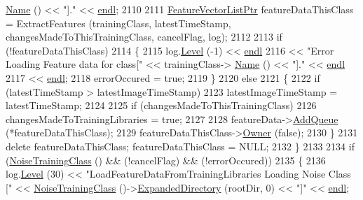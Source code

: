 \begin{DoxyCode}
      \hyperlink{class_k_k_m_l_l_1_1_training_class_ae10b765db09d3aadabdffa35960c906a}{Name} () << \textcolor{stringliteral}{"]."} << \hyperlink{namespace_k_k_b_ad1f50f65af6adc8fa9e6f62d007818a8}{endl};
2110 
2111     \hyperlink{class_k_k_m_l_l_1_1_feature_vector_list}{FeatureVectorListPtr}  featureDataThisClass = ExtractFeatures (trainingClass, 
      latestTimeStamp, changesMadeToThisTrainingClass, cancelFlag, log);
2112 
2113     \textcolor{keywordflow}{if}  (!featureDataThisClass)
2114     \{
2115       log.\hyperlink{class_k_k_b_1_1_run_log_a32cf761d7f2e747465fd80533fdbb659}{Level} (-1) << \hyperlink{namespace_k_k_b_ad1f50f65af6adc8fa9e6f62d007818a8}{endl}
2116                      << \textcolor{stringliteral}{"Error Loading Feature data for class["} << trainingClass->
      \hyperlink{class_k_k_m_l_l_1_1_training_class_ae10b765db09d3aadabdffa35960c906a}{Name} () << \textcolor{stringliteral}{"]."} << \hyperlink{namespace_k_k_b_ad1f50f65af6adc8fa9e6f62d007818a8}{endl}
2117                      << \hyperlink{namespace_k_k_b_ad1f50f65af6adc8fa9e6f62d007818a8}{endl};
2118       errorOccured = \textcolor{keyword}{true};
2119     \}
2120     \textcolor{keywordflow}{else}
2121     \{
2122       \textcolor{keywordflow}{if}  (latestTimeStamp > latestImageTimeStamp)
2123         latestImageTimeStamp = latestTimeStamp;
2124 
2125       \textcolor{keywordflow}{if}  (changesMadeToThisTrainingClass)
2126         changesMadeToTrainingLibraries = \textcolor{keyword}{true};
2127 
2128       featureData->\hyperlink{class_k_k_m_l_l_1_1_feature_vector_list_a90809e07f7e33e591da0d266c1907ca9}{AddQueue} (*featureDataThisClass);
2129       featureDataThisClass->\hyperlink{class_k_k_b_1_1_k_k_queue_a4990d037ff09dd504cc7df53819bf61a}{Owner} (\textcolor{keyword}{false});
2130     \}
2131     \textcolor{keyword}{delete}  featureDataThisClass;  featureDataThisClass = NULL;
2132   \}
2133 
2134   \textcolor{keywordflow}{if}  (\hyperlink{class_k_k_m_l_l_1_1_training_configuration2_a3fae0dc2f5f2b875c64992f16cef09e1}{NoiseTrainingClass} ()  &&  (!cancelFlag)  &&  (!errorOccured))
2135   \{
2136     log.\hyperlink{class_k_k_b_1_1_run_log_a32cf761d7f2e747465fd80533fdbb659}{Level} (30) << \textcolor{stringliteral}{"LoadFeatureDataFromTrainingLibraries  Loading Noise Class ["} << 
      \hyperlink{class_k_k_m_l_l_1_1_training_configuration2_a3fae0dc2f5f2b875c64992f16cef09e1}{NoiseTrainingClass} ()->\hyperlink{class_k_k_m_l_l_1_1_training_class_ace6d7708b3809e1183a9f6c86b2ee432}{ExpandedDirectory} (rootDir, 0) << \textcolor{stringliteral}{"]"} << 
      \hyperlink{namespace_k_k_b_ad1f50f65af6adc8fa9e6f62d007818a8}{endl};

\end{DoxyCode}
